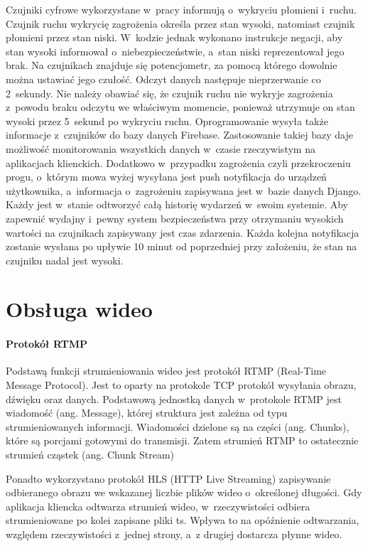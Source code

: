 Czujniki cyfrowe wykorzystane w~pracy informują o~wykryciu płomieni i~ruchu. Czujnik ruchu wykrycię zagrożenia określa przez stan wysoki, natomiast czujnik płomieni przez stan niski. W~kodzie jednak wykonano instrukcje negacji, aby stan wysoki informował o~niebezpieczeństwie, a~stan niski reprezentował jego brak. Na czujnikach znajduje się potencjometr, za pomocą którego dowolnie można ustawiać jego czułość. Odczyt danych następuje nieprzerwanie co 2~sekundy. Nie należy obawiać się, że czujnik ruchu nie wykryje zagrożenia z~powodu braku odczytu we właściwym momencie, ponieważ utrzymuje on stan wysoki przez 5~sekund po wykryciu ruchu. Oprogramowanie wysyła także informacje z~czujników do bazy danych Firebase. Zastosowanie takiej bazy daje możliwość monitorowania wszystkich danych w~czasie rzeczywistym na aplikacjach klienckich. Dodatkowo w~przypadku zagrożenia czyli przekroczeniu progu, o~którym mowa wyżej wysyłana jest push notyfikacja do urządzeń użytkownika, a~informacja o~zagrożeniu zapisywana jest w~bazie danych Django. Każdy jest w~stanie odtworzyć całą historię wydarzeń w~swoim systemie.
Aby zapewnić wydajny i~pewny system bezpieczeństwa przy otrzymaniu wysokich wartości na czujnikach zapisywany jest czas zdarzenia. Każda kolejna notyfikacja zostanie wysłana po upływie 10 minut od poprzedniej przy założeniu, że stan na czujniku nadal jest wysoki. 

\section{Obsługa wideo}

\paragraph{Protokół RTMP}
Podstawą funkcji strumieniowania wideo jest protokół RTMP (Real-Time Message Protocol). Jest to oparty na protokole TCP protokół wysyłania obrazu, dźwięku oraz danych. \cite{MOBILERTMP}
Podstawową jednostką danych w~protokole RTMP jest wiadomość (ang. Message), której struktura jest zależna od typu strumieniowanych informacji. 
Wiadomości dzielone są na części (ang. Chunks), które są porcjami gotowymi do transmisji. Zatem strumień RTMP to ostatecznie strumień cząstek (ang. Chunk Stream) \cite{STREAMRTMP}

Ponadto wykorzystano protokół HLS (HTTP Live Streaming) zapisywanie odbieranego obrazu we wskazanej liczbie plików wideo o~określonej długości. Gdy aplikacja kliencka odtwarza strumień wideo, w~rzeczywistości odbiera strumieniowane po kolei zapisane pliki ts. Wpływa to na opóźnienie odtwarzania, względem rzeczywistości z~jednej strony, a~z drugiej dostarcza płynne wideo.

